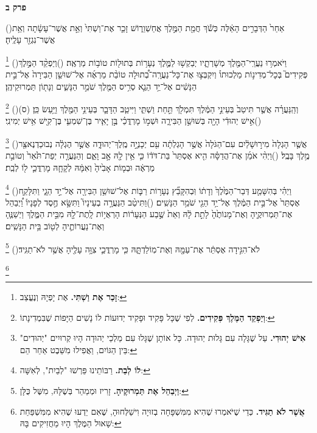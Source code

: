 \documentclass[12pt, openany]{book}
\newcommand{\chapname}{}
\newcommand{\newchap}[1]{
	\addcontentsline{toc}{chapter}{#1}
	\renewcommand{\chapname}{#1}
		\begin{center}
			\textbf{%
\fontsize{16pt}{16pt}\selectfont
				#1}
		\end{center}
}
\newcommand{\footnotecomment}[1]{
	\renewcommand\thefootnote{}
	\footnote{\textsf{#1}}}
\newcommand{\commenta}[1]{\footnotecomment{#1}\hspace{0em}}
\newcommand{\vsnum}[1]{(\hebrewnumeral{#1})\space}
\begin{document}
\newchap{פרק ב}
\begin{multicols}{2}
\vsnum{1}אַחַר֙ הַדְּבָרִ֣ים הָאֵ֔לֶּה כְּשֹׁ֕ךְ חֲמַ֖ת הַמֶּ֣לֶךְ אֲחַשְׁוֵר֑וֹשׁ זָכַ֤ר אֶת־וַשְׁתִּי֙ וְאֵ֣ת אֲשֶׁר־עָשָׂ֔תָה וְאֵ֥ת אֲשֶׁר־נִגְזַ֖ר עָלֶֽיהָ׃%
\commenta{\textrm{\textbf{זָכַר אֶת וַשְׁתִּי.}} אֶת יָפְיָהּ וְנֶעֱצַב:}%
\vsnum{2}וַיֹּאמְר֥וּ נַעֲרֵֽי־הַמֶּ֖לֶךְ מְשָׁרְתָ֑יו יְבַקְשׁ֥וּ לַמֶּ֛לֶךְ נְעָר֥וֹת בְּתוּל֖וֹת טוֹב֥וֹת מַרְאֶֽה׃
\vsnum{3}וְיַפְקֵ֨ד הַמֶּ֣לֶךְ פְּקִידִים֮ בְּכָל־מְדִינ֣וֹת מַלְכוּתוֹ֒ וְיִקְבְּצ֣וּ אֶת־כָּל־נַעֲרָֽה־בְ֠תוּלָה טוֹבַ֨ת מַרְאֶ֜ה אֶל־שׁוּשַׁ֤ן הַבִּירָה֙ אֶל־בֵּ֣ית הַנָּשִׁ֔ים אֶל־יַ֥ד הֵגֶ֛א סְרִ֥יס הַמֶּ֖לֶךְ שֹׁמֵ֣ר הַנָּשִׁ֑ים וְנָת֖וֹן תַּמְרוּקֵיהֶֽן׃%
\commenta{\textrm{\textbf{וְיַפְקֵד הַמֶּלֶךְ פְּקִידִים.}} לְפִי שֶׁכָּל פָּקִיד וּפָקִיד יְדוּעוֹת לוֹ נָשִׁים הַיָּפוֹת שֶׁבִּמְדִינָתוֹ:}%
\vsnum{4}וְהַֽנַּעֲרָ֗ה אֲשֶׁ֤ר תִּיטַב֙ בְּעֵינֵ֣י הַמֶּ֔לֶךְ תִּמְלֹ֖ךְ תַּ֣חַת וַשְׁתִּ֑י וַיִּיטַ֧ב הַדָּבָ֛ר בְּעֵינֵ֥י הַמֶּ֖לֶךְ וַיַּ֥עַשׂ כֵּֽן׃ (ס)
\vsnum{5}אִ֣ישׁ יְהוּדִ֔י הָיָ֖ה בְּשׁוּשַׁ֣ן הַבִּירָ֑ה וּשְׁמ֣וֹ מָרְדֳּכַ֗י בֶּ֣ן יָאִ֧יר בֶּן־שִׁמְעִ֛י בֶּן־קִ֖ישׁ אִ֥ישׁ יְמִינִֽי׃%
\commenta{\textrm{\textbf{אִישׁ יְהוּדִי.}} עַל שֶׁגָּלָה עִם גָּלוּת יְהוּדָה. כָּל אוֹתָן שֶׁגָּלוּ עִם מַלְכֵי יְהוּדָה הָיוּ קְרוּיִים "יְהוּדִים" בֵּין הַגּוֹיִם, וַאֲפִילוּ מִשֵּׁבֶט אַחֵר הֵם: }%
\vsnum{6}אֲשֶׁ֤ר הָגְלָה֙ מִיר֣וּשָׁלַ֔יִם עִם־הַגֹּלָה֙ אֲשֶׁ֣ר הָגְלְתָ֔ה עִ֖ם יְכָנְיָ֣ה מֶֽלֶךְ־יְהוּדָ֑ה אֲשֶׁ֣ר הֶגְלָ֔ה נְבוּכַדְנֶאצַּ֖ר מֶ֥לֶךְ בָּבֶֽל׃
\vsnum{7}וַיְהִ֨י אֹמֵ֜ן אֶת־הֲדַסָּ֗ה הִ֤יא אֶסְתֵּר֙ בַּת־דֹּד֔וֹ כִּ֛י אֵ֥ין לָ֖הּ אָ֣ב וָאֵ֑ם וְהַנַּעֲרָ֤ה יְפַת־תֹּ֙אַר֙ וְטוֹבַ֣ת מַרְאֶ֔ה וּבְמ֤וֹת אָבִ֙יהָ֙ וְאִמָּ֔הּ לְקָחָ֧הּ מָרְדֳּכַ֛י ל֖וֹ לְבַֽת׃%
\commenta{\textrm{\textbf{לוֹ לְבַת.}} רַבּוֹתֵינוּ פֵּרְשׁוּ "לְבַיִת", לְאִשָּׁה: }%
\vsnum{8}וַיְהִ֗י בְּהִשָּׁמַ֤ע דְּבַר־הַמֶּ֙לֶךְ֙ וְדָת֔וֹ וּֽבְהִקָּבֵ֞ץ נְעָר֥וֹת רַבּ֛וֹת אֶל־שׁוּשַׁ֥ן הַבִּירָ֖ה אֶל־יַ֣ד הֵגָ֑י וַתִּלָּקַ֤ח אֶסְתֵּר֙ אֶל־בֵּ֣ית הַמֶּ֔לֶךְ אֶל־יַ֥ד הֵגַ֖י שֹׁמֵ֥ר הַנָּשִֽׁים׃
\vsnum{9}וַתִּיטַ֨ב הַנַּעֲרָ֣ה בְעֵינָיו֮ וַתִּשָּׂ֣א חֶ֣סֶד לְפָנָיו֒ וַ֠יְבַהֵל אֶת־תַּמְרוּקֶ֤יהָ וְאֶת־מָנוֹתֶ֙הָ֙ לָתֵ֣ת לָ֔הּ וְאֵת֙ שֶׁ֣בַע הַנְּעָר֔וֹת הָרְאֻי֥וֹת לָֽתֶת־לָ֖הּ מִבֵּ֣ית הַמֶּ֑לֶךְ וַיְשַׁנֶּ֧הָ וְאֶת־נַעֲרוֹתֶ֛יהָ לְט֖וֹב בֵּ֥ית הַנָּשִֽׁים׃%
\commenta{\textrm{\textbf{וַיְבַהֵל אֶת תַּמְרוּקֶיהָ.}} זָרִיז וּמְמַהֵר בְּשֶׁלָּהּ, מִשֶּׁל כֻּלָּן: }%
\vsnum{10}לֹא־הִגִּ֣ידָה אֶסְתֵּ֔ר אֶת־עַמָּ֖הּ וְאֶת־מֽוֹלַדְתָּ֑הּ כִּ֧י מָרְדֳּכַ֛י צִוָּ֥ה עָלֶ֖יהָ אֲשֶׁ֥ר לֹא־תַגִּֽיד׃%
\commenta{\textrm{\textbf{אֲשֶׁר לֹא תַגִּיד.}} כְּדֵי שֶׁיֹּאמְרוּ שֶׁהִיא מִמִּשְׁפָּחָה בְזוּיָה וִישַׁלְּחוּהָ, שֶׁאִם יֵדְעוּ שֶׁהִיא מִמִּשְׁפַּחַת שָׁאוּל הַמֶּלֶךְ הָיוּ מַחֲזִיקִים בָּהּ: }%

\end{multicols}
\end{document}
